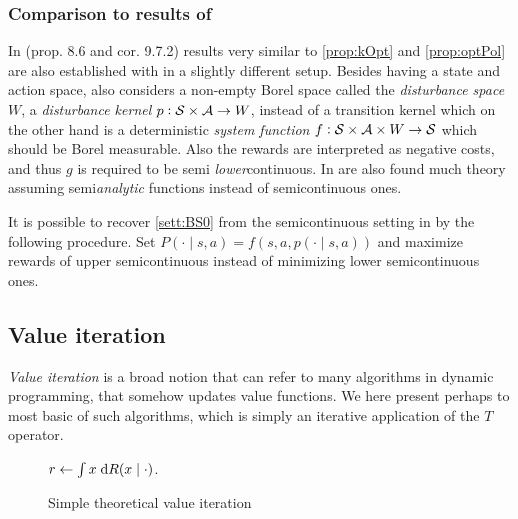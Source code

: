 \subsubsection{Comparison to results of }
In  (prop. 8.6 and cor. 9.7.2) results very similar to
\cref{prop:kOpt} and \cref{prop:optPol} are also established
with in a slightly different setup.
Besides having a state and action space,  also considers a
non-empty Borel space called the
\emph{disturbance space} $W$, a \emph{disturbance kernel}
$p: \mathcal{S} \times \mathcal{A} \to W$,
instead of a transition kernel which on the other hand is a deterministic
\emph{system function} $f : \mathcal{S} \times \mathcal{A} \times W \to \mathcal{S}$
which should be Borel measurable.
Also the rewards are interpreted as negative costs, and thus
$g$ is required to be semi \emph{lower}continuous.
In  are also found much theory assuming semi\emph{analytic}
functions instead of semicontinuous ones.

It is possible to recover \cref{sett:BS0} from the semicontinuous setting
in  by the following procedure.
Set $P(\cdot \mid s, a) = f(s, a, p(\cdot \mid s, a))$
and maximize rewards of upper semicontinuous instead of
minimizing lower semicontinuous ones.

\subsection{Value iteration}

\emph{Value iteration} is a broad notion that can refer to many algorithms
in dynamic programming, that somehow updates value functions.
We here present perhaps to most basic of such algorithms, which is simply
an iterative application of the $T$ operator.

\begin{figure}[H]
  \begin{algorithm}[H] %
    \caption{Simple theoretical value iteration}
    $r \leftarrow \int x \; \mathrm{d} R(x \mid \cdot)$.


  \label{alg:valueIteration}
  \end{algorithm}
\end{figure}

